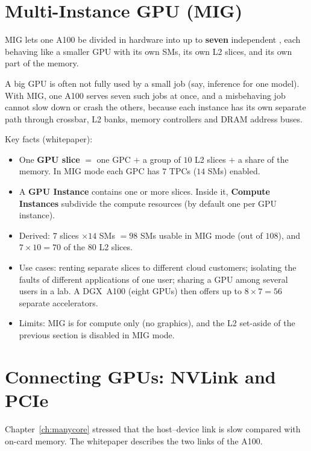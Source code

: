 \section{Multi-Instance GPU (MIG)}
\oos

\begin{definition}{MIG}
 lets one A100 be divided in hardware into up to \textbf{seven} independent , each behaving like a smaller GPU with its own SMs, its own L2 slices, and its own part of the memory.
\end{definition}
\begin{intuition}
A big GPU is often not fully used by a small job (say, inference for one model). With MIG, one A100 serves seven such jobs at once, and a misbehaving job cannot slow down or crash the others,
because each instance has its own separate path through crossbar, L2 banks, memory controllers and DRAM address buses.
\end{intuition}
Key facts (whitepaper):
\begin{itemize}
  \item One \textbf{GPU slice} $=$ one GPC $+$ a group of $10$ L2 slices $+$ a share of the memory. In MIG mode each GPC has $7$ TPCs ($14$ SMs) enabled.
  \item A \textbf{GPU Instance} contains one or more slices. Inside it, \textbf{Compute Instances} subdivide the compute resources (by default one per GPU instance).
  \item Derived: $7$ slices $\times14$ SMs $=98$ SMs usable in MIG mode (out of $108$), and $7\times10=70$ of the $80$ L2 slices.
  \item Use cases: renting separate slices to different cloud customers; isolating the faults of different applications of one user; sharing a GPU among several users in a lab. A DGX~A100 (eight GPUs) then offers up to $8\times7=56$ separate accelerators.
  \item Limits: MIG is for compute only (no graphics), and the L2 set-aside of the previous section is disabled in MIG mode.
\end{itemize}

\section{Connecting GPUs: NVLink and PCIe}
\oos

Chapter~\ref{ch:manycore} stressed that the host--device link is slow compared with on-card memory. The whitepaper describes the two links of the A100.

